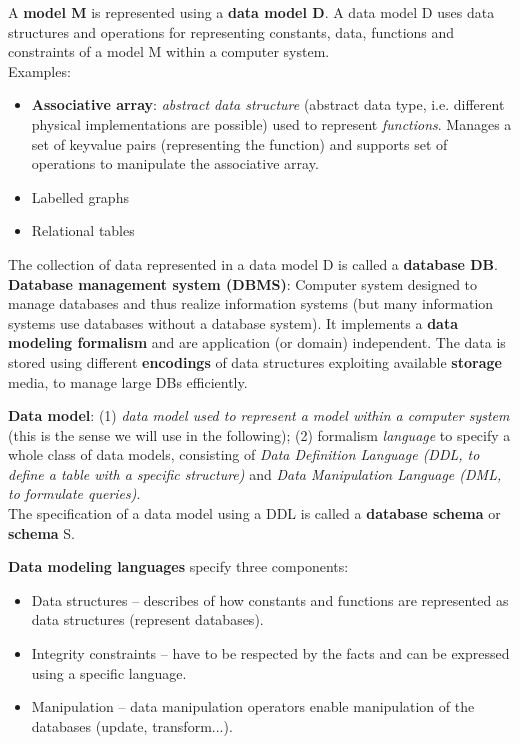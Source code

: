 A \textbf{model M} is represented using a \textbf{data model D}. A data model D uses data structures and operations for representing constants, data, functions and constraints of a model M within a computer system.\\
Examples:
\begin{itemize}
	\item \textbf{Associative array}: \emph{abstract data structure} (abstract data type, i.e. different physical implementations are possible) used to represent \emph{functions}. Manages a set of keyvalue pairs (representing the function) and supports set of operations to manipulate the associative array.
	\item Labelled graphs
	\item Relational tables
\end{itemize}

The collection of data represented in a data model D is called a \textbf{database DB}.\\
\textbf{Database management system (DBMS)}: Computer system designed to manage databases and thus realize information systems (but many information systems use databases without a database system). It implements a \textbf{data modeling formalism} and are application (or domain) independent. The data is stored using different \textbf{encodings} of data structures exploiting available \textbf{storage} media, to manage large DBs efficiently.

\textbf{Data model}: (1) \emph{data model used to represent a model within a computer system} (this is the sense we will use in the following); (2) formalism \emph{language} to specify a whole class of data models, consisting of \emph{Data Definition Language (DDL, to define a table with a specific structure)} and \emph{Data Manipulation Language (DML, to formulate queries)}.\\
The specification of a data model using a DDL is called a \textbf{database schema} or \textbf{schema} S.

\textbf{Data modeling languages} specify three components:
\begin{itemize}
	\item Data structures -- describes of how constants and functions are represented as data structures (represent databases).
	\item Integrity constraints -- have to be respected by the facts and can be expressed using a specific language.
	\item Manipulation -- data manipulation operators enable manipulation of the databases (update, transform...).
\end{itemize}

